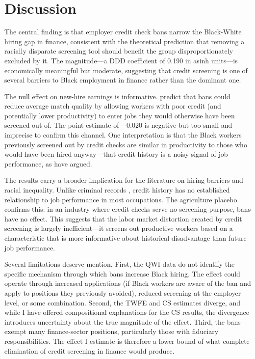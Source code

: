 \documentclass[12pt]{article}
\begin{document}
\section{Discussion}
\label{sec:discussion}

The central finding is that employer credit check bans narrow the Black-White hiring gap in finance, consistent with the theoretical prediction that removing a racially disparate screening tool should benefit the group disproportionately excluded by it. The magnitude---a DDD coefficient of 0.190 in asinh units---is economically meaningful but moderate, suggesting that credit screening is one of several barriers to Black employment in finance rather than the dominant one.

The null effect on new-hire earnings is informative. \citet{cortes2021employer} predict that bans could reduce average match quality by allowing workers with poor credit (and potentially lower productivity) to enter jobs they would otherwise have been screened out of. The point estimate of $-0.020$ is negative but too small and imprecise to confirm this channel. One interpretation is that the Black workers previously screened out by credit checks are similar in productivity to those who would have been hired anyway---that credit history is a noisy signal of job performance, as \citet{clifford2017employer} have argued.

The results carry a broader implication for the literature on hiring barriers and racial inequality. Unlike criminal records \citep{holzer2006perceived,doleac2020unintended}, credit history has no established relationship to job performance in most occupations. The agriculture placebo confirms this: in an industry where credit checks serve no screening purpose, bans have no effect. This suggests that the labor market distortion created by credit screening is largely inefficient---it screens out productive workers based on a characteristic that is more informative about historical disadvantage than future job performance.

Several limitations deserve mention. First, the QWI data do not identify the specific mechanism through which bans increase Black hiring. The effect could operate through increased applications (if Black workers are aware of the ban and apply to positions they previously avoided), reduced screening at the employer level, or some combination. Second, the TWFE and CS estimates diverge, and while I have offered compositional explanations for the CS results, the divergence introduces uncertainty about the true magnitude of the effect. Third, the bans exempt many finance-sector positions, particularly those with fiduciary responsibilities. The effect I estimate is therefore a lower bound of what complete elimination of credit screening in finance would produce.
\end{document}
